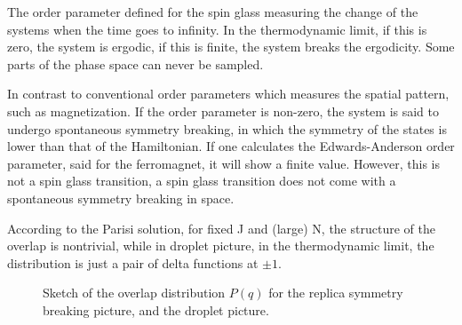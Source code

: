 The order parameter defined for the spin glass measuring the change of the systems
when the time goes to infinity. In the thermodynamic limit, if this
is zero, the system is ergodic, if this is finite, the system breaks
the ergodicity. Some parts of the phase space can never be sampled.

In contrast to conventional order parameters which measures the 
spatial pattern, such as magnetization. If the order parameter is non-zero, 
the system is said to undergo spontaneous symmetry breaking, in which the symmetry of 
the states is lower than that of the Hamiltonian. If one calculates
the Edwards-Anderson order parameter, said for the ferromagnet, it will
show a finite value. However, this is not a spin glass transition, a
spin glass transition does not come with a spontaneous symmetry breaking in space.

According to the Parisi solution, for fixed J and (large) N, the structure of 
the overlap is nontrivial, while in droplet picture, in the thermodynamic limit, 
the distribution is just a pair of delta functions at $\pm 1$. 

\begin{figure}
  \centering 
  \hspace{0.5cm}
  \caption{Sketch of the overlap distribution $P(q)$ for the replica symmetry 
breaking picture, and the droplet picture.}
  \label{fig:overlap}
\end{figure}


